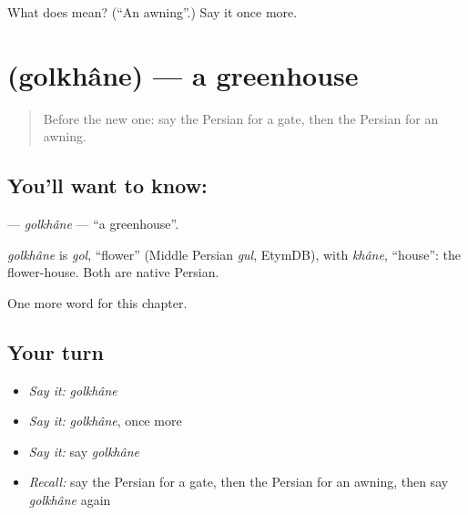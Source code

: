 \begin{tcolorbox}[breakable,colback=teal!4,colframe=teal!35!black,title={Before you move on}]
What does  mean? (\textquotedblleft{}An awning\textquotedblright{}.) Say it once more.
\end{tcolorbox}
\section[\texorpdfstring{\fa{گلخانه} (golkhâne)}{گلخانه (golkhâne)}]{ (golkhâne) — a greenhouse}

\label{lesson:FA-C268-golkhane}



\begin{quote}
Before the new one: say the Persian for a gate, then the Persian for an awning.
\end{quote}

\subsection*{You'll want to know: }
\textbf{} — \emph{golkhâne} — \textquotedblleft{}a greenhouse\textquotedblright{}.

\begin{cousinweb}
\emph{golkhâne} is \emph{gol}, \textquotedblleft{}flower\textquotedblright{} (Middle Persian \emph{gul}, EtymDB), with \emph{khâne}, \textquotedblleft{}house\textquotedblright{}: the flower-house. Both are native Persian.
\end{cousinweb}

\begin{grammarlens}[title={What you've built}]
One more word for this chapter.
\end{grammarlens}

\subsection*{Your turn}
\begin{itemize}
\raggedright
  \item \emph{Say it:} \emph{golkhâne}
  \item \emph{Say it:} \emph{golkhâne}, once more
  \item \emph{Say it:} say \emph{golkhâne}
  \item \emph{Recall:} say the Persian for a gate, then the Persian for an awning, then say \emph{golkhâne} again
\end{itemize}

